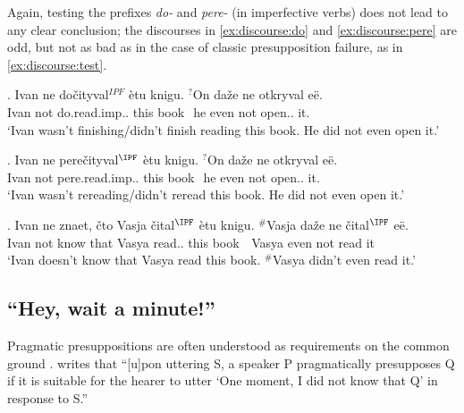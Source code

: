 Again, testing the prefixes \textit{do-} and \textit{pere-} (in imperfective verbs) does not lead to any clear conclusion; the discourses in \ref{ex:discourse:do} and \ref{ex:discourse:pere} are odd, but not as bad as in the case of classic presupposition failure, as in \ref{ex:discourse:test}.

\exg. \label{ex:discourse:do}Ivan ne do\v{c}ityval$^{IPF}$ \`{e}tu knigu. $^?$On da\v{z}e ne otkryval e\"{e}.\\
Ivan not do.read.imp.. this book \textcolor{white}{$^?$}he even not open.. it.\\
\trans `Ivan wasn't finishing/didn't finish reading this book. He did not even open it.'

\exg. \label{ex:discourse:pere}Ivan ne pere\v{c}ityval$^{\IPF}$ \`{e}tu knigu. $^?$On da\v{z}e ne otkryval e\"{e}.\\
Ivan not pere.read.imp.. this book \textcolor{white}{$^?$}he even not open.. it.\\
\trans `Ivan wasn't rereading/didn't reread this book. He did not even open it.'

\exg. \label{ex:discourse:test}Ivan ne znaet, \v{c}to Vasja \v{c}ital$^{\IPF}$ \`{e}tu knigu. $^\#$Vasja da\v{z}e ne \v{c}ital$^{\IPF}$ e\"{e}.\\
Ivan not know that Vasya read.. this book \textcolor{white}{$^\#$}Vasya even not read it\\
\trans `Ivan doesn't know that Vasya read this book. $^\#$Vasya didn't even read it.'


\subsection{``Hey, wait a minute!''}
Pragmatic presuppositions are often understood as requirements on the common ground \citep[see e.g.,][]{Karttunen:73, Stalnaker:73, Shanon:76, Heim:83}. \citet[][248]{Shanon:76} writes that ``[u]pon uttering S, a speaker P pragmatically presupposes Q if it is suitable for the hearer to utter `One moment, I did not know that Q' in response to S.''

